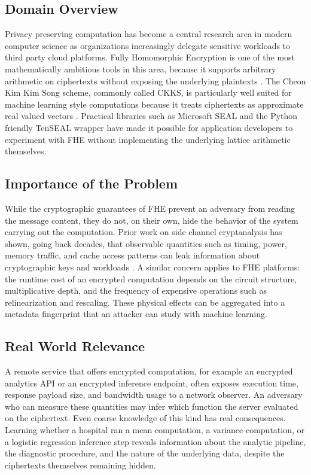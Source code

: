 \documentclass[12pt,a4paper]{article}
\begin{document}
\subsection{Domain Overview}
Privacy preserving computation has become a central research area in modern computer science as organizations increasingly delegate sensitive workloads to third party cloud platforms. Fully Homomorphic Encryption is one of the most mathematically ambitious tools in this area, because it supports arbitrary arithmetic on ciphertexts without exposing the underlying plaintexts \cite{gentry2009fully}. The Cheon Kim Kim Song scheme, commonly called CKKS, is particularly well suited for machine learning style computations because it treats ciphertexts as approximate real valued vectors \cite{cheon2017homomorphic}. Practical libraries such as Microsoft SEAL \cite{sealcrypto} and the Python friendly TenSEAL wrapper \cite{benaissa2021tenseal} have made it possible for application developers to experiment with FHE without implementing the underlying lattice arithmetic themselves.

\subsection{Importance of the Problem}
While the cryptographic guarantees of FHE prevent an adversary from reading the message content, they do not, on their own, hide the behavior of the system carrying out the computation. Prior work on side channel cryptanalysis has shown, going back decades, that observable quantities such as timing, power, memory traffic, and cache access patterns can leak information about cryptographic keys and workloads \cite{kocher1996timing, kocher1999dpa}. A similar concern applies to FHE platforms: the runtime cost of an encrypted computation depends on the circuit structure, multiplicative depth, and the frequency of expensive operations such as relinearization and rescaling. These physical effects can be aggregated into a metadata fingerprint that an attacker can study with machine learning.

\subsection{Real World Relevance}
A remote service that offers encrypted computation, for example an encrypted analytics API or an encrypted inference endpoint, often exposes execution time, response payload size, and bandwidth usage to a network observer. An adversary who can measure these quantities may infer which function the server evaluated on the ciphertext. Even coarse knowledge of this kind has real consequences. Learning whether a hospital ran a mean computation, a variance computation, or a logistic regression inference step reveals information about the analytic pipeline, the diagnostic procedure, and the nature of the underlying data, despite the ciphertexts themselves remaining hidden.
\end{document}
